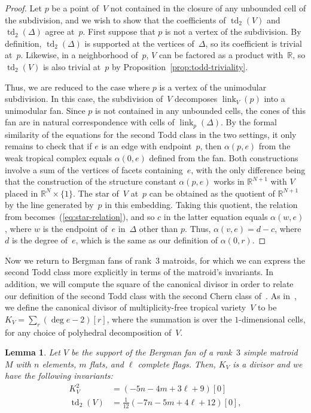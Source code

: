 \documentclass[11pt]{amsart}
\newtheorem{lem}[thm]{Lemma}
\theoremstyle{definition}
\newcommand{\link}{\operatorname{link}}
\newcommand{\RR}{\mathbb R}
\newcommand{\td}{\operatorname{td}}
\begin{document}
\begin{proof}
Let $p$ be a point of~$V$ not contained in the closure of any unbounded cell
of the subdivision, and we wish to show that the coefficients of $\td_2(V)$ and
$\td_2(\Delta)$ agree at~$p$. First suppose that $p$ is not a vertex of the
subdivision. By definition, $\td_2(\Delta)$ is supported at the vertices
of~$\Delta$, so its coefficient is trivial at~$p$. Likewise, in a neighborhood
of~$p$, $V$ can be factored as a product with~$\RR$, so $\td_2(V)$ is also
trivial at~$p$ by Proposition~\ref{prop:todd-triviality}.

Thus, we are reduced to the case where $p$ is a vertex of the unimodular
subdivision. In this case, the subdivision of~$V$ decomposes $\link_V(p)$ into a
unimodular fan. Since $p$ is not contained in any unbounded cells, the cones of
this fan are in natural correspondence with cells of $\link_p(\Delta)$. By the
formal similarity of the equations for the second Todd class in the two
settings, it only remains to check that if $e$ is an edge with
endpoint~$p$, then $\alpha(p,e)$ from the weak tropical complex equals
$\alpha(0,e)$ defined from the fan. Both constructions involve a sum of the
vertices of facets containing~$e$, with the only difference being
that the construction of the structure constant $\alpha(p,e)$ works in
$\RR^{N+1}$ with $V$ placed in $\RR^{N} \times \{1\}$. The star of~$V$ at~$p$
can be obtained as the quotient of $\RR^{N+1}$ by the line generated by~$p$ in
this embedding. Taking this quotient, the relation from
\cite[Const.~3.3]{cartwright-complexes} becomes~(\ref{eq:star-relation}), and so
$c$ in the latter equation equals $\alpha(w, e)$, where $w$ is the endpoint
of~$e$ in~$\Delta$ other than $p$. Thus, $\alpha(v,e) = d - c$, where $d$ is the
degree of~$e$, which is the same as our definition of $\alpha(0, r)$.
\end{proof}

Now we return to Bergman fans of rank~$3$ matroids, for which we can express the
second Todd class more explicitly in terms of the matroid's invariants.
In addition, we will
compute the square of the canonical divisor in order to relate our definition of
the second Todd class with the second Chern class of~\cite{shaw}. As
in~\cite[Sec.~5.3]{mikhalkin}, we define the canonical divisor of
multiplicity-free tropical variety~$V$ to be $K_V = \sum_r (\deg e - 2) [r]$,
where the summation is over the $1$-dimensional cells, for any choice of
polyhedral decomposition of~$V$.

\begin{lem}\label{lem:matroid-invariants}
Let $V$ be the support of the Bergman fan of a rank~$3$ simple matroid~$M$ with
$n$ elements, $m$ flats, and $\ell$ complete flags. Then, $K_V$ is a divisor and
we have the following invariants:
\begin{align*}
K_V^2 &= (-5n - 4m + 3 \ell +9) [0] \\
\td_2(V) &= {\textstyle\frac{1}{12}}(-7n -5m +4\ell + 12) [0],
\end{align*}
\end{lem}
\end{document}
